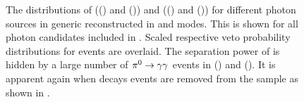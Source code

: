 \begin{figure}[hbtp!]
    \centering
    \caption{\label{fig:vetos} 
    The distributions of \piVeto (() and ()) 
    and \etaVeto (() and ())
    for different photon sources in generic \MC reconstructed in \feiBp and \feiBz modes.
    This is shown for all photon candidates included in .
    Scaled respective veto probability distributions for \BtoXsgamma events are overlaid.
    The separation power of \etaVeto is hidden by a large number of $\pi^0\rightarrow\gamma\gamma$ events in () and ().
    It is apparent again when \piz decays events are removed from the sample as shown in .
    }
\end{figure}

